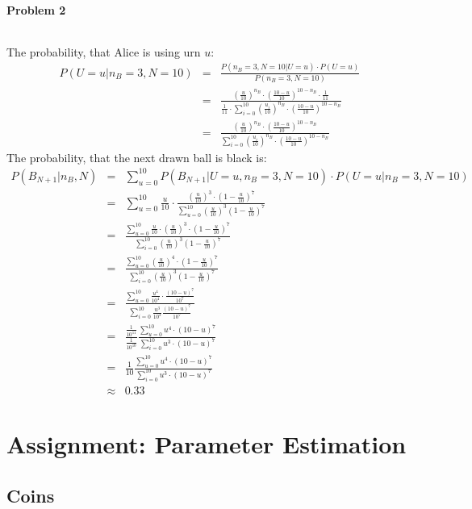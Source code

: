 \documentclass{article}
\begin{document}
\paragraph*{Problem 2}
$\;$ 

The probability, that Alice is using urn $u$:
\begin{eqnarray}
P(U = u | n_B = 3,N = 10) &=& \frac{P(n_B = 3, N = 10 | U = u) \cdot P(U = u)}{P(n_B = 3, N = 10)}\\
&=& \frac{	(\frac{u}{10})^{n_B} \cdot (\frac{10-u}{10})^{10-n_B}\cdot \frac{1}{11}}{\frac{1}{11} \cdot \sum_{i=0}^{10} (\frac{u_i}{10})^{n_B} \cdot (\frac{10-u}{10})^{10-n_B}}\\
&=& \frac{	(\frac{u}{10})^{n_B} \cdot (\frac{10-u}{10})^{10-n_B}}{\sum_{i=0}^{10} (\frac{u_i}{10})^{n_B} \cdot (\frac{10-u}{10})^{10-n_B}}
\end{eqnarray}
The probability, that the next drawn ball is black is:
\begin{eqnarray}
P(B_{N+1} | n_B, N) &=& \sum_{u=0}^{10} P(B_{N+1} | U=u,n_B = 3,N = 10) \cdot P(U=u | n_B = 3, N = 10)\\
&=& \sum_{u=0}^{10} \frac{u}{10} \cdot \frac{(\frac{u}{10})^3 \cdot (1-\frac{u}{10})^7}{\sum_{u=0}^{10}(\frac{u}{10})^3(1-\frac{u}{10})^7}\\
&=& \frac{\sum_{u=0}^{10} \frac{u}{10} \cdot (\frac{u}{10})^3 \cdot (1-\frac{u}{10})^7}{\sum_{i=0}^{10}(\frac{u}{10})^3(1-\frac{u}{10})^7}\\
&=& \frac{\sum_{u=0}^{10} (\frac{u}{10})^4 \cdot (1-\frac{u}{10})^7}{\sum_{i=0}^{10}(\frac{u}{10})^3(1-\frac{u}{10})^7}\\
&=& \frac{\sum_{u=0}^{10} \frac{u^4}{10^4} \cdot \frac{(10-u)^7}{10^7}}{\sum_{i=0}^{10} \frac{u^3}{10^3}\frac{(10-u)^7}{10^7}}\\
&=& \frac{\frac{1}{10^11}}{\frac{1}{10^10}} \frac{\sum_{u=0}^{10} u^4 \cdot (10-u)^7}{\sum_{i=0}^{10} u^3 \cdot (10-u)^7}\\
&=& \frac{1}{10} \frac{\sum_{u=0}^{10} u^4 \cdot (10-u)^7}{\sum_{i=0}^{10} u^3 \cdot (10-u)^7}\\
&\approx & 0.33 
\end{eqnarray}
\section{Assignment: Parameter Estimation}
\subsection{Coins}
\end{document}
